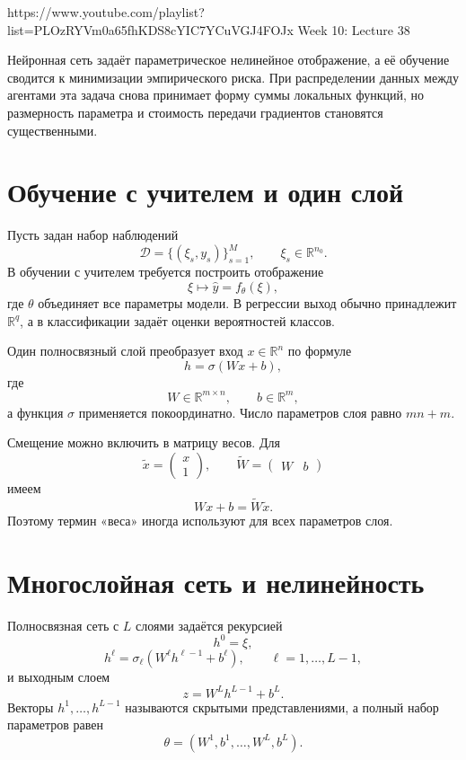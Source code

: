 
\sourcevideo
    {https://www.youtube.com/playlist?list=PLOzRYVm0a65fhKDS8cYIC7YCuVGJ4FOJx}
    {Week 10: Lecture 38}

Нейронная сеть задаёт параметрическое нелинейное отображение, а её
обучение сводится к минимизации эмпирического риска. При распределении
данных между агентами эта задача снова принимает форму суммы локальных
функций, но размерность параметра и стоимость передачи градиентов
становятся существенными.

\section{Обучение с учителем и один слой}

Пусть задан набор наблюдений
\[
    \mathcal D
    =
    \{(\xi_s,y_s)\}_{s=1}^{M},
    \qquad
    \xi_s\in\mathbb R^{n_0}.
\]
В обучении с учителем требуется построить отображение
\[
    \xi\longmapsto \widehat y=f_\theta(\xi),
\]
где \(\theta\) объединяет все параметры модели. В регрессии выход
обычно принадлежит \(\mathbb R^q\), а в классификации задаёт оценки
вероятностей классов.

Один полносвязный слой преобразует вход \(x\in\mathbb R^n\) по
формуле
\[
    h=\sigma(Wx+b),
\]
где
\[
    W\in\mathbb R^{m\times n},
    \qquad
    b\in\mathbb R^m,
\]
а функция \(\sigma\) применяется покоординатно. Число параметров
слоя равно \(mn+m\).

Смещение можно включить в матрицу весов. Для
\[
    \widetilde x
    =
    \begin{pmatrix}
        x\\
        1
    \end{pmatrix},
    \qquad
    \widetilde W
    =
    \begin{pmatrix}
        W & b
    \end{pmatrix}
\]
имеем
\[
    Wx+b=\widetilde W\widetilde x.
\]
Поэтому термин «веса» иногда используют для всех параметров слоя.

\section{Многослойная сеть и нелинейность}

Полносвязная сеть с \(L\) слоями задаётся рекурсией
\[
    h^0=\xi,
\]
\[
    h^\ell
    =
    \sigma_\ell
    \left(
        W^\ell h^{\ell-1}+b^\ell
    \right),
    \qquad
    \ell=1,\ldots,L-1,
\]
и выходным слоем
\[
    z=W^Lh^{L-1}+b^L.
\]
Векторы \(h^1,\ldots,h^{L-1}\) называются скрытыми
представлениями, а полный набор параметров равен
\[
    \theta
    =
    (W^1,b^1,\ldots,W^L,b^L).
\]

